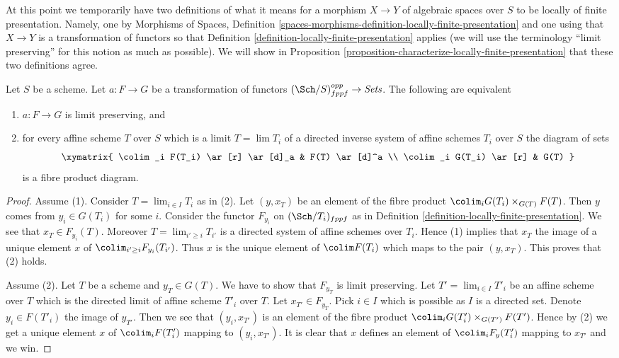 \medskip\noindent
At this point we temporarily have two definitions of what it means
for a morphism $X \to Y$ of algebraic spaces over $S$ to be locally of finite
presentation. Namely, one by
Morphisms of Spaces,
Definition \ref{spaces-morphisms-definition-locally-finite-presentation}
and one using that $X \to Y$ is a transformation of functors so that
Definition \ref{definition-locally-finite-presentation}
applies (we will use the terminology ``limit preserving''
for this notion as much as possible). We will show in
Proposition \ref{proposition-characterize-locally-finite-presentation}
that these two definitions agree.

\begin{lemma}
\label{lemma-characterize-relative-limit-preserving}
Let $S$ be a scheme. Let $a : F \to G$ be a transformation of functors
$(\Sch/S)_{fppf}^{opp} \to \textit{Sets}$.
The following are equivalent
\begin{enumerate}
\item $a : F \to G$ is limit preserving, and
\item for every affine scheme $T$ over $S$ which is a
limit $T = \lim T_i$ of a directed inverse system of affine
schemes $T_i$ over $S$ the diagram of sets
$$
\xymatrix{
\colim_i F(T_i) \ar[r] \ar[d]_a & F(T) \ar[d]^a \\
\colim_i G(T_i) \ar[r] & G(T)
}
$$
is a fibre product diagram.
\end{enumerate}
\end{lemma}

\begin{proof}
Assume (1). Consider $T = \lim_{i \in I} T_i$ as in (2). Let
$(y, x_T)$ be an element of the fibre product
$\colim_i G(T_i) \times_{G(T)} F(T)$.
Then $y$ comes from $y_i \in G(T_i)$ for some $i$.
Consider the functor $F_{y_i}$ on $(\Sch/T_i)_{fppf}$ as in
Definition \ref{definition-locally-finite-presentation}.
We see that $x_T \in F_{y_i}(T)$. Moreover $T = \lim_{i' \geq i} T_{i'}$
is a directed system of affine schemes over $T_i$. Hence (1) implies
that $x_T$ the image of a unique element $x$ of
$\colim_{i' \geq i} F_{y_i}(T_{i'})$. Thus $x$ is the unique
element of $\colim F(T_i)$ which maps to the pair $(y, x_T)$.
This proves that (2) holds.

\medskip\noindent
Assume (2). Let $T$ be a scheme and $y_T \in G(T)$. We have to show that
$F_{y_T}$ is limit preserving. Let $T' = \lim_{i \in I} T'_i$ be an
affine scheme over $T$ which is the directed limit of affine scheme $T'_i$
over $T$. Let $x_{T'} \in F_{y_T}$. Pick $i \in I$ which is possible as
$I$ is a directed set. Denote $y_i \in F(T'_i)$ the
image of $y_{T'}$. Then we see that $(y_i, x_{T'})$ is an
element of the fibre product
$\colim_i G(T'_i) \times_{G(T')} F(T')$.
Hence by (2) we get a unique element $x$ of $\colim_i F(T'_i)$
mapping to $(y_i, x_{T'})$. It is clear that $x$ defines an element
of $\colim_i F_y(T'_i)$ mapping to $x_{T'}$ and we win.
\end{proof}

